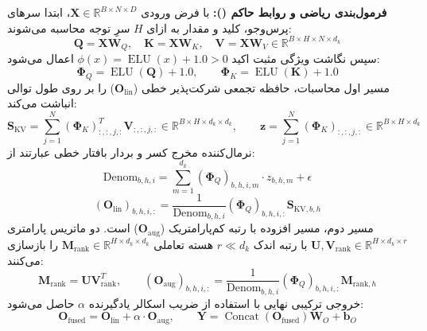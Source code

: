 \textbf{فرمول‌بندی ریاضی و روابط حاکم ():}
با فرض ورودی $\mathbf{X} \in \mathbb{R}^{B \times N \times D}$، ابتدا سرهای پرس‌وجو، کلید و مقدار به ازای $H$ سرِ توجه محاسبه می‌شوند:
\begin{equation}
\mathbf{Q} = \mathbf{X}\mathbf{W}_Q, \quad \mathbf{K} = \mathbf{X}\mathbf{W}_K, \quad \mathbf{V} = \mathbf{X}\mathbf{W}_V \in \mathbb{R}^{B \times H \times N \times d_k}
\end{equation}
سپس نگاشت ویژگی مثبت اکید $\phi(x) = \operatorname{ELU}(x) + 1.0 > 0$ اعمال می‌شود:
\begin{equation}
\mathbf{\Phi}_Q = \operatorname{ELU}(\mathbf{Q}) + 1.0, \qquad \mathbf{\Phi}_K = \operatorname{ELU}(\mathbf{K}) + 1.0
\end{equation}
مسیر اول محاسبات، حافظه تجمعی شرکت‌پذیر خطی ($\mathbf{O}_{\text{lin}}$) را بر روی طول توالی انباشت می‌کند:
\begin{equation}
\mathbf{S}_{\text{KV}} = \sum_{j=1}^N (\mathbf{\Phi}_K)_{:, :, j, :}^T \mathbf{V}_{:, :, j, :} \in \mathbb{R}^{B \times H \times d_k \times d_k}, \qquad
\mathbf{z} = \sum_{j=1}^N (\mathbf{\Phi}_K)_{:, :, j, :} \in \mathbb{R}^{B \times H \times d_k}
\end{equation}
نرمال‌کننده مخرج کسر و بردار بافتار خطی عبارتند از:
\begin{equation}
\text{Denom}_{b, h, i} = \sum_{m=1}^{d_k} (\mathbf{\Phi}_Q)_{b, h, i, m} \cdot z_{b, h, m} + \epsilon
\end{equation}
\begin{equation}
(\mathbf{O}_{\text{lin}})_{b, h, i, :} = \frac{1}{\text{Denom}_{b, h, i}} (\mathbf{\Phi}_Q)_{b, h, i, :} \mathbf{S}_{\text{KV}, b, h}
\end{equation}
مسیر دوم، مسیر افزوده با رتبه کم‌پارامتریک ($\mathbf{O}_{\text{aug}}$) است. دو ماتریس پارامتری $\mathbf{U}, \mathbf{V}_{\text{rank}} \in \mathbb{R}^{H \times d_k \times r}$ با رتبه اندک $r \ll d_k$ هسته تعاملی $\mathbf{M}_{\text{rank}} \in \mathbb{R}^{H \times d_k \times d_k}$ را بازسازی می‌کنند:
\begin{equation}
\mathbf{M}_{\text{rank}} = \mathbf{U} \mathbf{V}_{\text{rank}}^T, \qquad
(\mathbf{O}_{\text{aug}})_{b, h, i, :} = \frac{1}{\text{Denom}_{b, h, i}} (\mathbf{\Phi}_Q)_{b, h, i, :} \mathbf{M}_{\text{rank}, h}
\end{equation}
خروجی ترکیبی نهایی با استفاده از ضریب اسکالر یادگیرنده $\alpha$ حاصل می‌شود:
\begin{equation}
\mathbf{O}_{\text{fused}} = \mathbf{O}_{\text{lin}} + \alpha \cdot \mathbf{O}_{\text{aug}}, \qquad \mathbf{Y} = \operatorname{Concat}(\mathbf{O}_{\text{fused}}) \mathbf{W}_O + \mathbf{b}_O
\end{equation}

